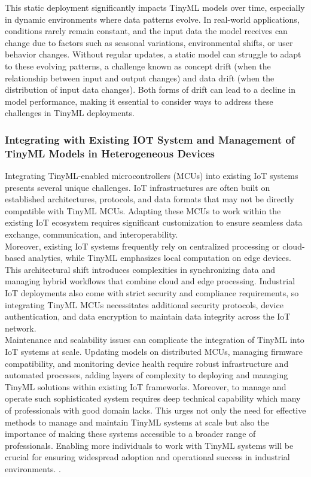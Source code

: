 \documentclass[twocolumn]{article}
\begin{document}
This static deployment significantly impacts TinyML models over time, especially in dynamic environments where data patterns evolve. In real-world applications, conditions rarely remain constant, and the input data the model receives can change due to factors such as seasonal variations, environmental shifts, or user behavior changes. Without regular updates, a static model can struggle to adapt to these evolving patterns, a challenge known as concept drift (when the relationship between input and output changes) and data drift (when the distribution of input data changes). Both forms of drift can lead to a decline in model performance, making it essential to consider ways to address these challenges in TinyML deployments.


\subsubsection{Integrating with Existing IOT System and Management of TinyML Models in Heterogeneous Devices}
Integrating TinyML-enabled microcontrollers (MCUs) into existing IoT systems presents several unique challenges. IoT infrastructures are often built on established architectures, protocols, and data formats that may not be directly compatible with TinyML MCUs. Adapting these MCUs to work within the existing IoT ecosystem requires significant customization to ensure seamless data exchange, communication, and interoperability.\\[0.1cm]

Moreover, existing IoT systems frequently rely on centralized processing or cloud-based analytics, while TinyML emphasizes local computation on edge devices. This architectural shift introduces complexities in synchronizing data and managing hybrid workflows that combine cloud and edge processing. Industrial IoT deployments also come with strict security and compliance requirements, so integrating TinyML MCUs necessitates additional security protocols, device authentication, and data encryption to maintain data integrity across the IoT network.\\[0.1cm]

Maintenance and scalability issues can complicate the integration of TinyML into IoT systems at scale. Updating models on distributed MCUs, managing firmware compatibility, and monitoring device health require robust infrastructure and automated processes, adding layers of complexity to deploying and managing TinyML solutions within existing IoT frameworks. Moreover, to manage and operate such sophisticated system requires deep technical capability which many of professionals with good domain lacks. This urges not only the need for effective methods to manage and maintain TinyML systems at scale but also the importance of making these systems accessible to a broader range of professionals. Enabling more individuals to work with TinyML systems will be crucial for ensuring widespread adoption and operational success in industrial environments. \cite{hussein_original_2024, paul_rethinking_2021, de_prado_robustifying_2020,ren_synergy_2021,roshan_adaptive_2021}.\\[0.1cm]
\end{document}
